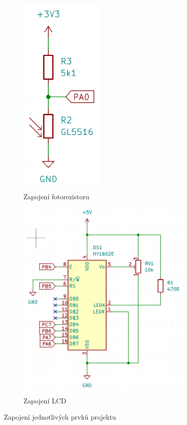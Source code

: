 \documentclass[a4paper,10pt,titlepage]{article}
\begin{document}
\begin{figure}[h]
 \centering
  \begin{subfigure}{0.4\textwidth}
   \centering
   \includegraphics[height=10cm]{assets/ldr.png}
   \caption{Zapojení fotorezistoru}
  \end{subfigure}
  \begin{subfigure}{0.4\textwidth}
   \centering
   \includegraphics[height=10cm]{assets/lcd.png}
   \caption{Zapojení LCD}
  \end{subfigure}
  \caption{Zapojení jednotlivých prvků projektu}
\end{figure}
\end{document}
